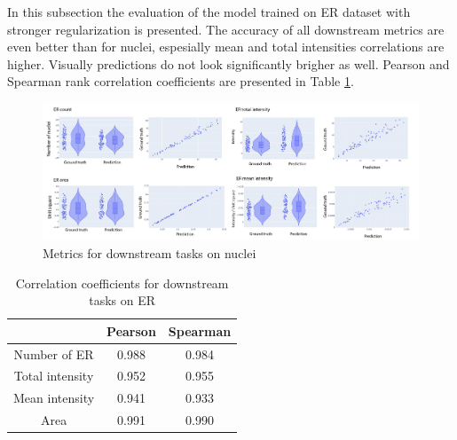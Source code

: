 In this subsection the evaluation of the model trained on ER dataset with stronger regularization is presented. The accuracy of all downstream metrics are even better than for nuclei, espesially mean and total intensities correlations are higher. Visually predictions do not look significantly brigher as well. Pearson and Spearman rank correlation coefficients are presented in Table \ref{table:er-downstream-metrics-coefficients}.

\begin{figure}[htb]
	\begin{center}
		\includegraphics[width=\linewidth]{bilder/ER/metrics/combined-metrics.png}
		\caption{Metrics for downstream tasks on nuclei}\label{fig:er-downstream-metrics}
	\end{center}
\end{figure}

\begin{table}[htb]
    \centering
    \caption{Correlation coefficients for downstream tasks on ER}
        \begin{adjustbox}{width=0.4\textwidth}
            \begin{tabular}{|c|c|c|}\hline
                &Pearson&Spearman
                \\\hline\hline
                Number of ER & 0.988 & 0.984\\\hline
                Total intensity&0.952&0.955\\\hline
                Mean intensity&0.941&0.933\\\hline
                Area &0.991&0.990\\\hline
            \end{tabular}
        \label{table:er-downstream-metrics-coefficients}
        \end{adjustbox}
\end{table}
